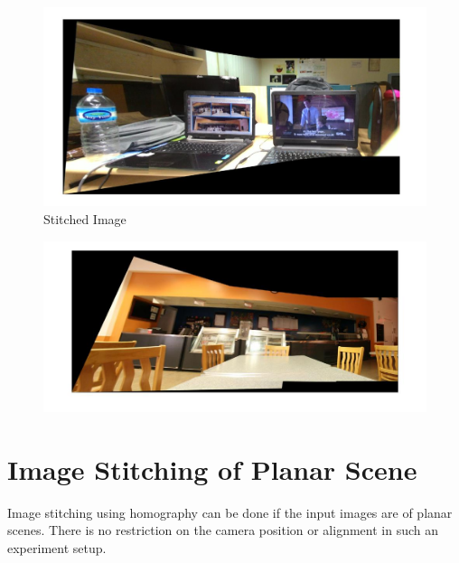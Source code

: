 \documentclass[12pt]{article}
\begin{document}
\begin{figure}[htp]
\centering
\includegraphics[width=1\textwidth]{imageStitching2.jpg}\hfill
\caption{Stitched Image}
\end{figure}



\begin{figure}[htp]
\centering
\includegraphics[width=1\textwidth]{imageSticthing1.jpg}\hfill
\end{figure}

\clearpage

\section{Image Stitching of Planar Scene}
Image stitching using homography can be done if the input images are of planar scenes. There is no restriction on the camera position or alignment in such an experiment setup.
\end{document}
